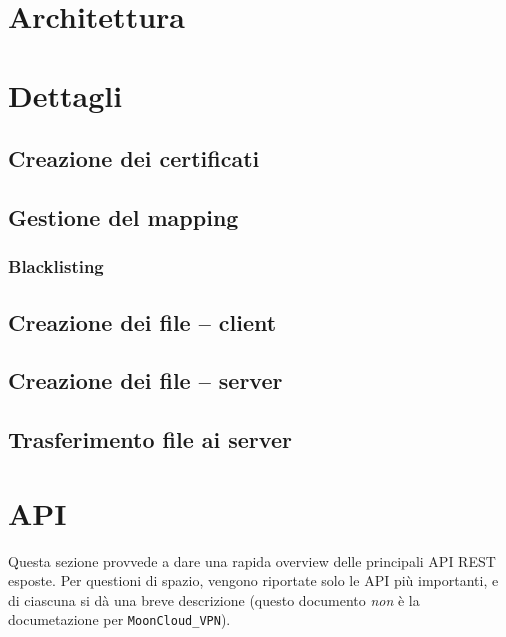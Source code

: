 \section{Architettura}


\section{Dettagli}

\subsection{Creazione dei certificati}

\subsection{Gestione del mapping}

\subsubsection{Blacklisting}

\subsection{Creazione dei file -- client}

\subsection{Creazione dei file -- server}

\subsection{Trasferimento file ai server}

\section{API}
Questa sezione provvede a dare una rapida overview delle principali API REST
esposte. Per questioni di spazio, vengono riportate solo le API più importanti,
e di ciascuna si dà una breve descrizione (questo documento \textit{non} è
la documetazione per \texttt{MoonCloud\_VPN}).
